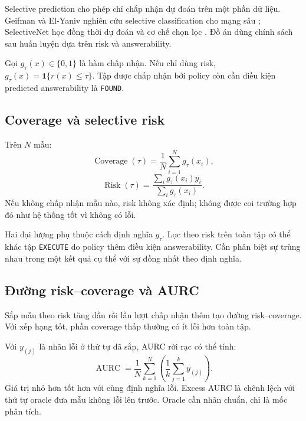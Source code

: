 Selective prediction cho phép chỉ chấp nhận dự đoán trên một phần dữ liệu. Geifman và El-Yaniv nghiên cứu selective classification cho mạng sâu \cite{geifman2017selective}; SelectiveNet học đồng thời dự đoán và cơ chế chọn lọc \cite{geifman2019selectivenet}. Đồ án dùng chính sách sau huấn luyện dựa trên risk và answerability.

Gọi $g_\tau(x)\in\{0,1\}$ là hàm chấp nhận. Nếu chỉ dùng risk, $g_\tau(x)=\mathbf{1}\{r(x)\leq\tau\}$. Tập được chấp nhận bởi policy còn cần điều kiện predicted answerability là \texttt{FOUND}.

\subsection{Coverage và selective risk}

Trên $N$ mẫu:
\begin{equation}
    \operatorname{Coverage}(\tau)=
    \frac{1}{N}\sum_{i=1}^{N}g_\tau(x_i),
    \label{eq:theory-coverage}
\end{equation}
\begin{equation}
    \operatorname{Risk}(\tau)=
    \frac{\sum_i g_\tau(x_i)y_i}{\sum_i g_\tau(x_i)}.
    \label{eq:theory-selective-risk}
\end{equation}
Nếu không chấp nhận mẫu nào, risk không xác định; không được coi trường hợp đó như hệ thống tốt vì không có lỗi.

Hai đại lượng phụ thuộc cách định nghĩa $g_\tau$. Lọc theo risk trên toàn tập có thể khác tập \texttt{EXECUTE} do policy thêm điều kiện answerability. Cần phân biệt sự trùng nhau trong một kết quả cụ thể với sự đồng nhất theo định nghĩa.

\subsection{Đường risk--coverage và AURC}

Sắp mẫu theo risk tăng dần rồi lần lượt chấp nhận thêm tạo đường risk--coverage. Với xếp hạng tốt, phần coverage thấp thường có ít lỗi hơn toàn tập.

Với $y_{(j)}$ là nhãn lỗi ở thứ tự đã sắp, AURC rời rạc có thể tính:
\begin{equation}
    \operatorname{AURC}=\frac{1}{N}\sum_{k=1}^{N}
           \left(\frac{1}{k}\sum_{j=1}^{k}y_{(j)}\right).
    \label{eq:theory-aurc}
\end{equation}
Giá trị nhỏ hơn tốt hơn với cùng định nghĩa lỗi. Excess AURC là chênh lệch với thứ tự oracle đưa mẫu không lỗi lên trước. Oracle cần nhãn chuẩn, chỉ là mốc phân tích.

